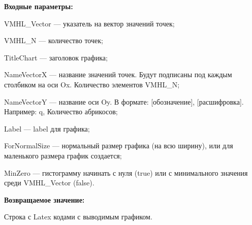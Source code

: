 \textbf{Входные параметры:}
 
VMHL\_Vector --- указатель на вектор значений точек;
 
VMHL\_N --- количество точек;
 
TitleChart --- заголовок графика;
 
NameVectorX --- название значений точек. Будут подписаны под каждым столбиком на оси Ox. Количество элементов VMHL\_N;
 
NameVectorY --- название оси Oy. В формате: [обозначение], [расшифровка]. Например: q, Количество абрикосов;
 
Label --- label для графика;
 
ForNormalSize --- нормальный размер графика (на всю ширину), или для маленького размера график создается;
 
MinZero --- гистограмму начинать с нуля (true) или с минимального значения среди VMHL\_Vector (false).
	
\textbf{Возвращаемое значение:}

Строка с Latex кодами с выводимым графиком.
